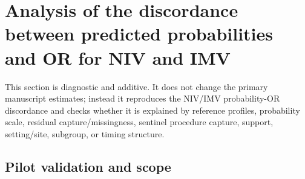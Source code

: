 \documentclass[
  11pt,
  letterpaper,
  DIV=11,
  numbers=noendperiod]{scrartcl}
\begin{document}
\section{Analysis of the discordance between predicted probabilities and
OR for NIV and
IMV}\label{analysis-of-the-discordance-between-predicted-probabilities-and-or-for-niv-and-imv}

This section is diagnostic and additive. It does not change the primary
manuscript estimates; instead it reproduces the NIV/IMV probability-OR
discordance and checks whether it is explained by reference profiles,
probability scale, residual capture/missingness, sentinel procedure
capture, support, setting/site, subgroup, or timing structure.

\subsection{Pilot validation and
scope}\label{pilot-validation-and-scope}
\end{document}

